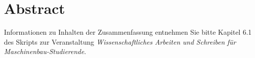 \section*{Abstract}
	Informationen zu Inhalten der Zusammenfassung entnehmen Sie bitte Kapitel 6.1 des Skripts zur Veranstaltung \textit{Wissenschaftliches Arbeiten und Schreiben für Maschinenbau-Studierende}.
		
	\blindtext
	
	\blindtext
	
	\blindtext